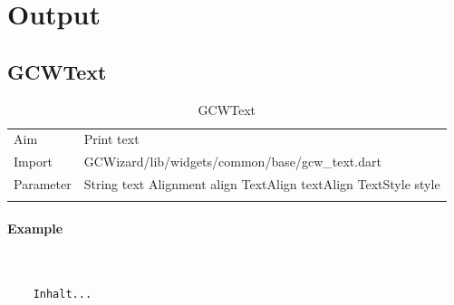 \newpage
\section{Output}
\subsection{GCWText}
\label{fig: GCWText}
\begin{table}[H]
\begin{tabular}[h]{p{2cm}p{9cm}}
    \caption{GCWText}
    Aim       & Print text\\
    Import    & GCWizard/lib/widgets/common/base/gcw\_text.dart\\
    Parameter & String text\newline
                Alignment align\newline
                TextAlign textAlign\newline
                TextStyle style\\
    \label{tab:GCWText}
\end{tabular}
\end{table}
\paragraph*{Example} \,
\begin{lstlisting}
    Inhalt...
\end{lstlisting}
\label{fig: ExampleGCWIntegerSpinner}

\newpage
